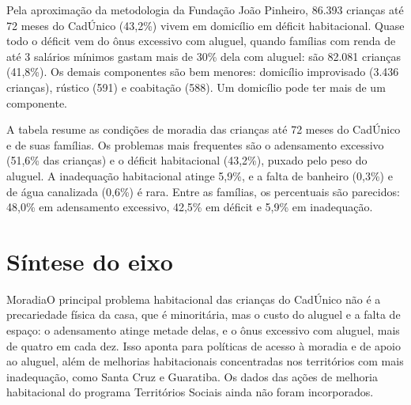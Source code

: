 
Pela aproximação da metodologia da Fundação João Pinheiro, 86.393 crianças até 72 meses do CadÚnico (43,2\%) vivem em domicílio em déficit habitacional. Quase todo o déficit vem do ônus excessivo com aluguel, quando famílias com renda de até 3 salários mínimos gastam mais de 30\% dela com aluguel: são 82.081 crianças (41,8\%). Os demais componentes são bem menores: domicílio improvisado (3.436 crianças), rústico (591) e coabitação (588). Um domicílio pode ter mais de um componente.



A tabela resume as condições de moradia das crianças até 72 meses do CadÚnico e de suas famílias. Os problemas mais frequentes são o adensamento excessivo (51,6\% das crianças) e o déficit habitacional (43,2\%), puxado pelo peso do aluguel. A inadequação habitacional atinge 5,9\%, e a falta de banheiro (0,3\%) e de água canalizada (0,6\%) é rara. Entre as famílias, os percentuais são parecidos: 48,0\% em adensamento excessivo, 42,5\% em déficit e 5,9\% em inadequação.


\section{Síntese do eixo}

\begin{sintese}{Moradia}O principal problema habitacional das crianças do CadÚnico não é a precariedade física da casa, que é minoritária, mas o custo do aluguel e a falta de espaço: o adensamento atinge metade delas, e o ônus excessivo com aluguel, mais de quatro em cada dez. Isso aponta para políticas de acesso à moradia e de apoio ao aluguel, além de melhorias habitacionais concentradas nos territórios com mais inadequação, como Santa Cruz e Guaratiba. Os dados das ações de melhoria habitacional do programa Territórios Sociais ainda não foram incorporados.\end{sintese}
